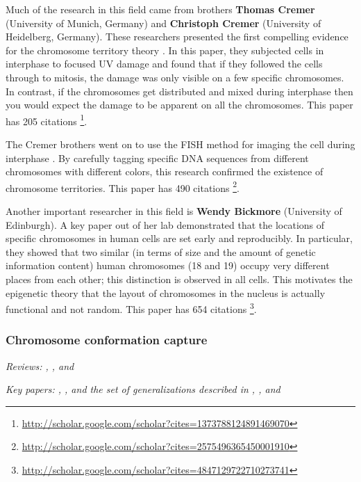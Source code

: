 \documentclass[12pt]{article}
\begin{document}
Much of the research in this field came from brothers {\bf Thomas Cremer}
(University of Munich, Germany) and {\bf Christoph Cremer} (University of
Heidelberg, Germany).
These researchers presented the first compelling evidence for the chromosome
territory theory \cite{hamster}.
In this paper, they subjected cells in interphase to focused UV damage and
found that if they followed the cells through to mitosis, the damage was only
visible on a few specific chromosomes.
In contrast, if the chromosomes get distributed and mixed during interphase
then you would expect the damage to be apparent on all the chromosomes.
This paper has 205 citations%
\footnote{\url{http://scholar.google.com/scholar?cites=1373788124891469070}}.


The Cremer brothers went on to use the FISH method for imaging the cell during
interphase \cite{cremer}.
By carefully tagging specific DNA sequences from different chromosomes with
different colors, this research confirmed the existence of chromosome
territories.
This paper has 490 citations%
\footnote{\url{http://scholar.google.com/scholar?cites=2575496365450001910}}.

Another important researcher in this field is {\bf Wendy Bickmore} (University
of Edinburgh).
A key paper out of her lab \cite{local} demonstrated that the locations of
specific chromosomes in human cells are set early and reproducibly.
In particular, they showed that two similar (in terms of size and the amount
of genetic information content) human chromosomes (18 and 19) occupy very
different places from each other; this distinction is observed in all cells.
This motivates the epigenetic theory that the layout of chromosomes in the
nucleus is actually functional and not random.
This paper has 654 citations%
\footnote{\url{http://scholar.google.com/scholar?cites=4847129722710273741}}.


\subsubsection*{Chromosome conformation capture}

\emph{Reviews: \cite{3c-review1}, \cite{3c-review2}, and \cite{3c-review3}}

\noindent\emph{Key papers: \cite{ccc}, \cite{looping}, and the set of
generalizations described in \cite{4c}, \cite{5c}, and \cite{hi-c}}
\end{document}
